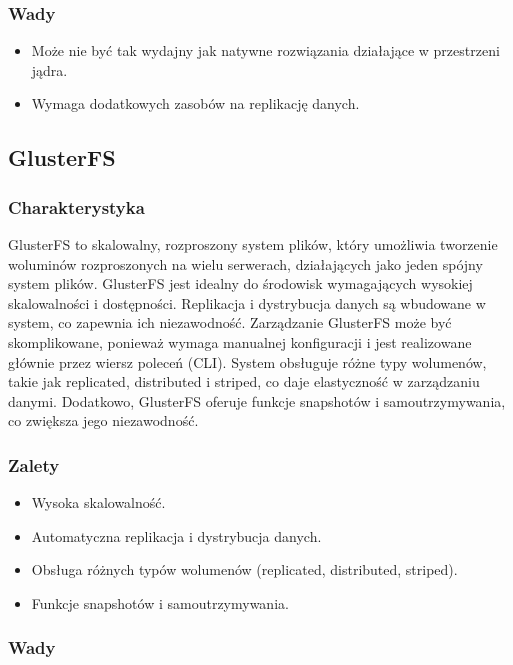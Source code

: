 \documentclass[polish,envcountsect,10pt]{article}
\begin{document}
\subsubsection{Wady}
\begin{itemize}
    \item Może nie być tak wydajny jak natywne rozwiązania działające w przestrzeni jądra.
    \item Wymaga dodatkowych zasobów na replikację danych.
\end{itemize}

\subsection{GlusterFS}

\subsubsection{Charakterystyka}

GlusterFS to skalowalny, rozproszony system plików, który umożliwia tworzenie woluminów rozproszonych na wielu serwerach, działających jako jeden spójny system plików. GlusterFS jest idealny do środowisk wymagających wysokiej skalowalności i dostępności. Replikacja i dystrybucja danych są wbudowane w system, co zapewnia ich niezawodność. Zarządzanie GlusterFS może być skomplikowane, ponieważ wymaga manualnej konfiguracji i jest realizowane głównie przez wiersz poleceń (CLI). System obsługuje różne typy wolumenów, takie jak replicated, distributed i striped, co daje elastyczność w zarządzaniu danymi. Dodatkowo, GlusterFS oferuje funkcje snapshotów i samoutrzymywania, co zwiększa jego niezawodność.

\subsubsection{Zalety}

\begin{itemize}
    \item Wysoka skalowalność.
    \item Automatyczna replikacja i dystrybucja danych.
    \item Obsługa różnych typów wolumenów (replicated, distributed, striped).
    \item Funkcje snapshotów i samoutrzymywania.
\end{itemize}

\subsubsection{Wady}
\end{document}
